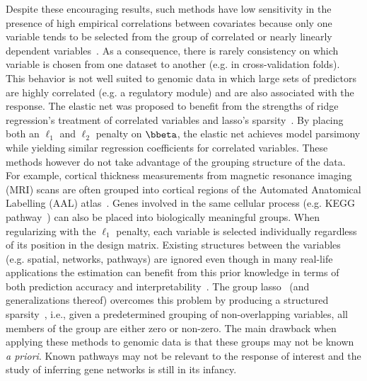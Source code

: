 \documentclass[12pt,letterpaper]{article}
\begin{document}
Despite these encouraging results, such methods have low sensitivity in the presence of high empirical correlations between covariates because only one variable tends to be selected from the group of correlated or nearly linearly dependent variables~\citep{buhlmann2013correlated}. 
As a consequence, there is rarely consistency on which variable is chosen from one dataset to another (e.g. in cross-validation folds). This behavior is not well suited to genomic data in which large sets of predictors are highly correlated (e.g. a regulatory module) and are also associated with the response. 
The elastic net was proposed to benefit from the strengths of ridge regression's treatment of correlated variables and lasso's sparsity~\citep{zou2005regularization}. By placing both an $\ell_1$ and $\ell_2$ penalty on $\bbeta$, the elastic net achieves model parsimony while yielding similar regression coefficients for correlated variables. 
These methods however do not take advantage of the grouping structure of the data. For example, cortical thickness measurements from magnetic resonance imaging (MRI) scans are often grouped into cortical regions of the Automated Anatomical Labelling (AAL) atlas~\citep{tzourio2002automated}. 
Genes involved in the same cellular process (e.g. KEGG pathway~\citep{kanehisa2008kegg}) can also be placed into biologically meaningful groups. When regularizing with the $\ell_1$ penalty, each variable is selected individually regardless of its position in the design matrix. 
Existing structures between the variables (e.g. spatial, networks, pathways) are ignored even though in many real-life applications the estimation can benefit from this prior knowledge in terms of both prediction accuracy and interpretability~\citep{bach2012structured}. 
The group lasso~\citep{yuan2006model} (and generalizations thereof) overcomes this problem by producing a structured sparsity~\citep{bach2012structured}, i.e., given a predetermined grouping of non-overlapping variables, all members of the group are either zero or non-zero. 
The main drawback when applying these methods to genomic data is that these groups may not be known \textit{a priori}. Known pathways may not be relevant to the response of interest and the study of inferring gene networks is still in its infancy. 
\end{document}
